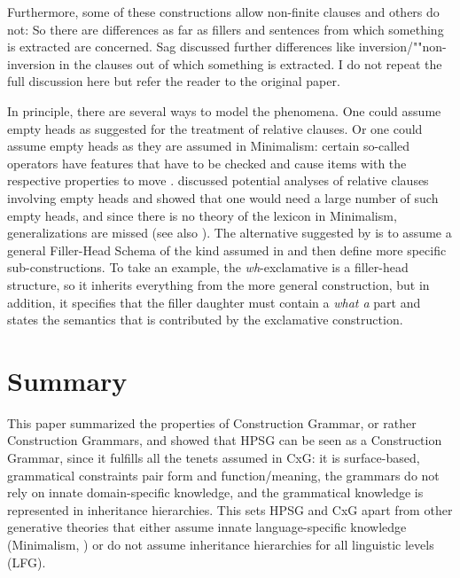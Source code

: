 \documentclass[output=paper
	        ,collection
	        ,collectionchapter
 	        ,biblatex
                ,babelshorthands
                ,newtxmath
                ,draftmode
                ,colorlinks, citecolor=brown
]{langscibook}
\begin{document}
Furthermore, some of these constructions allow non-finite clauses and others do not:
\eal
{}
\zl
So there are differences as far as fillers and sentences from which something is extracted
are concerned. Sag discussed further differences like inversion/""non-inversion in the clauses out of
which something is extracted. I do not repeat the full discussion here but refer the reader to the
original paper.

In principle, there are several ways to model the phenomena. One could assume empty
heads as \citet[Chapter~5]{ps2} suggested for the treatment of relative clauses. Or one could assume empty
heads as they are assumed in Minimalism: certain so-called operators have features that have to be
checked and cause items with the respective properties to move \citep[--331]{Adger2003a}. \citet{Borsley2006a} discussed potential
analyses of relative clauses involving empty heads and showed that one would need a large number of
such empty heads, and since there is no theory of the lexicon in Minimalism, generalizations are
missed (see also ). The alternative suggested by
\citet{Sag2010b} is to assume a general Filler-Head Schema of the kind assumed in  and
then define more specific sub-constructions. To take an example, the \emph{wh}-exclamative is a filler-head
structure, so it inherits everything from the more general construction, but in addition, it
specifies that the filler daughter must contain a \emph{what a} part and states the semantics that is
contributed by the exclamative construction.


\section{Summary}
\label{sec-summary}

This paper summarized the properties of Construction Grammar, or rather Construction Grammars, and
showed that HPSG can be seen as a Construction Grammar, since it fulfills all the tenets assumed in
CxG: it is surface-based, grammatical constraints pair form and function/meaning, the grammars do
not rely on innate domain-specific knowledge, and the grammatical knowledge is represented in
inheritance hierarchies. This sets HPSG and CxG apart from other generative theories that either
assume innate language-specific knowledge (Minimalism, \eg
\citealt{Chomsky2013a,Kayne94a-u,CR2010a}) or do not assume inheritance hierarchies for all linguistic levels (\eg LFG).
\end{document}
